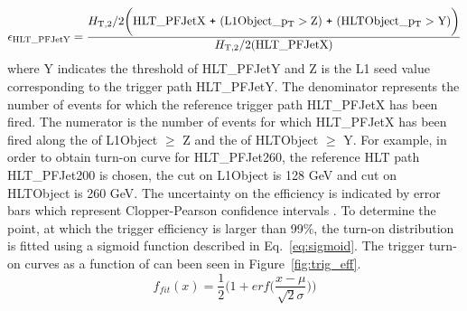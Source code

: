 \begin{equation}
 \label{eq:eff}
 {\rm \epsilon_{HLT\_PFJetY}} = \frac{\httwo {\rm \bigg(HLT\_PFJetX~\plus (L1Object\_\pt > Z)~\plus (HLTObject\_\pt > Y)\bigg)}}{\httwo {\rm (HLT\_PFJetX)}}
\end{equation}
where Y indicates the \pt threshold of HLT\_PFJetY and Z is the L1 seed value corresponding to the trigger path HLT\_PFJetY. The denominator represents the number of events for which the reference trigger path HLT\_PFJetX has been fired. The numerator is the number of events for which HLT\_PFJetX has been fired along the \pt of L1Object $\geq$ Z and the \pt of HLTObject $\geq$ Y. For example, in order to obtain turn-on curve for HLT\_PFJet260, the reference HLT path HLT\_PFJet200 is chosen, the \pt cut on L1Object is 128 GeV and \pt cut on HLTObject is 260 GeV. The uncertainty on the efficiency is indicated by error bars which represent Clopper-Pearson confidence intervals \cite{10.2307/2331986}. To determine the point, at which the trigger efficiency is larger than 99\%, the turn-on distribution is fitted using a sigmoid function described in Eq.~\ref{eq:sigmoid}. The trigger turn-on curves as a function of \httwo can been seen in Figure~\ref{fig:trig_eff}.
\begin{equation}
 \label{eq:sigmoid}
  f_{fit} (x) = \frac {1}{2} \Bigg( 1 ~\texttt{+}~ erf \Big(\frac {x - \mu}{\sqrt{2} \sigma} \Big) \Bigg)
\end{equation}

